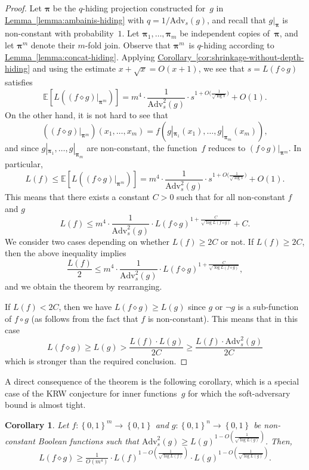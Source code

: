 \documentclass[11pt]{article}
\numberwithin{equation}{section}
\newtheorem{corollary}[theorem]{Corollary}
\theoremstyle{definition}
\theoremstyle{plain}
\newcommand{\expref}[2]{\hyperref[#2]{#1~\ref{#2}}}
\theoremstyle{definition}\newtheorem{notation}[theorem]{Notation}\theoremstyle{plain}
\newcommand{\E}{\mathbb{E}}
\newcommand{\B}{\left\{ 0,1 \right \}}
\newcommand{\p}{\boldsymbol{\pi}}
\newcommand{\Am}{\mathrm{Adv}_{s}}
\renewcommand{\d}{\diamond}
\theoremstyle{definition}
\theoremstyle{plain}
\begin{document}
\begin{proof}
Let $\p$ be the $q$-hiding projection constructed for~$g$ in \expref{Lemma}{lemma:ambainis-hiding}
with $q=1/\Am(g)$, and recall that $g|_{\p}$ is non-constant with
probability~$1$. Let $\p_{1},\ldots,\p_{m}$ be independent copies
of~$\p$, and let $\p^{m}$ denote their $m$-fold join. Observe
that $\p^{m}$~is $q$-hiding according to \expref{Lemma}{lemma:concat-hiding}.
Applying \expref{Corollary}{cor:shrinkage-without-depth-hiding} 
and using the estimate
$x+\sqrt{x}=O(x+1)$, we see that $s=L(f\d g)$ satisfies 
\[
\E\left[L\left((f\d g)|_{\p^{m}}\right)\right]=m^{4}\cdot\frac{1}{\Am^{2}(g)}\cdot s^{1+O\bigl(\frac{1}{\sqrt{\log s}}\bigr)}+O(1).
\]
On the other hand, it is not hard to see that 
\[
\left((f\d g)|_{\p^{m}}\right)(x_{1},\ldots,x_{m})=f\left(g|_{\p_{1}}(x_{1}),\ldots,g|_{\p_{m}}(x_{m})\right),
\]
and since $g|_{\p_{1}},\ldots,g|_{\p_{m}}$ are non-constant, the
function~$f$ reduces to $(f\d g)|_{\p^{m}}$. In particular, 
\[
L(f)\le\E\left[L\left((f\d g)|_{\p^{m}}\right)\right]=m^{4}\cdot\frac{1}{\Am^{2}(g)}\cdot s^{1+O\bigl(\frac{1}{\sqrt{\log s}}\bigr)}+O(1).
\]
This means that there exists a constant $C>0$ such that for all non-constant $f$ and $g$
\[
L(f)\le m^{4}\cdot\frac{1}{\Am^{2}(g)}\cdot L(f\d g)^{1+\frac{C}{\sqrt{\log L(f\d g)}}}+C.\]
We consider two cases depending on whether $L(f)\ge 2C$ or not. 
If $L(f) \ge 2C$, then the above inequality implies
\[\frac{L(f)}{2}\le m^{4}\cdot\frac{1}{\Am^{2}(g)}\cdot L(f\d g)^{1+\frac{C}{\sqrt{\log L(f\d g)}}},\]
 and we obtain the theorem by rearranging. 

If $L(f) < 2C$, then we have $L(f\d g) \ge L(g)$ since $g$ or $\neg g$ is a sub-function of $f\circ g$ (as follows from the fact that $f$ is non-constant).
This means that in this case 
\[L(f\d g) \ge L(g) > \frac{L(f) \cdot L(g)}{2C} \ge \frac{L(f) \cdot \Am^2(g)}{2C}
\]
which is stronger than the required conclusion.
\end{proof}
A direct consequence of the theorem is the following corollary, which
is a special case of the KRW conjecture for inner functions~$g$
for which the soft-adversary bound is almost tight. 
\begin{corollary}
\label{cor:KRW-special-case}Let $f\colon\B^{m}\to\B$ and $g\colon\B^{n}\to\B$
be non-constant Boolean functions such that $\Am^{2}(g)\ge L(g)^{1-O\left(\frac{1}{\sqrt{\log L(g)}}\right)}$.
Then, 
\[
L(f\d g)\ge\tfrac{1}{O(m^{4})}\cdot L\left(f\right)^{1-O\left(\frac{1}{\sqrt{\log L(f)}}\right)}\cdot L(g)^{1-O\left(\frac{1}{\sqrt{\log L(g)}}\right)}.
\]
\end{corollary}
%
%
\end{document}
